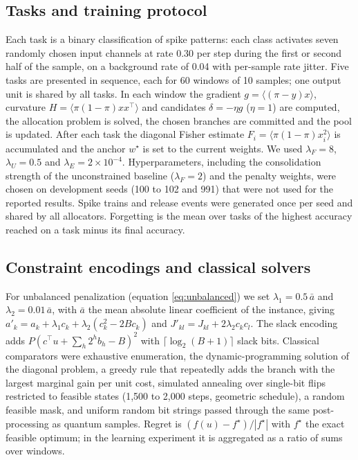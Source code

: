 \documentclass[12pt,a4paper]{article}
\begin{document}
\subsection*{Tasks and training protocol}
Each task is a binary classification of spike patterns: each class activates seven randomly chosen input channels at rate 0.30 per step during the first or second half of the sample, on a background rate of 0.04 with per-sample rate jitter. Five tasks are presented in sequence, each for 60 windows of 10 samples; one output unit is shared by all tasks. In each window the gradient $g=\langle(\pi-y)x\rangle$, curvature $H=\langle\pi(1-\pi)xx^{\top}\rangle$ and candidates $\delta=-\eta g$ ($\eta=1$) are computed, the allocation problem is solved, the chosen branches are committed and the pool is updated. After each task the diagonal Fisher estimate $F_{i}=\langle\pi(1-\pi)x_{i}^{2}\rangle$ is accumulated and the anchor $w^{\star}$ is set to the current weights. We used $\lambda_{F}=8$, $\lambda_{U}=0.5$ and $\lambda_{E}=2\times10^{-4}$. Hyperparameters, including the consolidation strength of the unconstrained baseline ($\lambda_{F}=2$) and the penalty weights, were chosen on development seeds (100 to 102 and 991) that were not used for the reported results. Spike trains and release events were generated once per seed and shared by all allocators. Forgetting is the mean over tasks of the highest accuracy reached on a task minus its final accuracy.

\subsection*{Constraint encodings and classical solvers}
For unbalanced penalization (equation \eqref{eq:unbalanced}) we set $\lambda_{1}=0.5\,\bar a$ and $\lambda_{2}=0.01\,\bar a$, with $\bar a$ the mean absolute linear coefficient of the instance, giving $a'_{k}=a_{k}+\lambda_{1}c_{k}+\lambda_{2}(c_{k}^{2}-2Bc_{k})$ and $J'_{kl}=J_{kl}+2\lambda_{2}c_{k}c_{l}$. The slack encoding adds $P(c^{\top}u+\sum_{h}2^{h}b_{h}-B)^{2}$ with $\lceil\log_{2}(B+1)\rceil$ slack bits. Classical comparators were exhaustive enumeration, the dynamic-programming solution of the diagonal problem, a greedy rule that repeatedly adds the branch with the largest marginal gain per unit cost, simulated annealing over single-bit flips restricted to feasible states (1,500 to 2,000 steps, geometric schedule), a random feasible mask, and uniform random bit strings passed through the same post-processing as quantum samples. Regret is $(f(u)-f^{\star})/|f^{\star}|$ with $f^{\star}$ the exact feasible optimum; in the learning experiment it is aggregated as a ratio of sums over windows.
\end{document}
